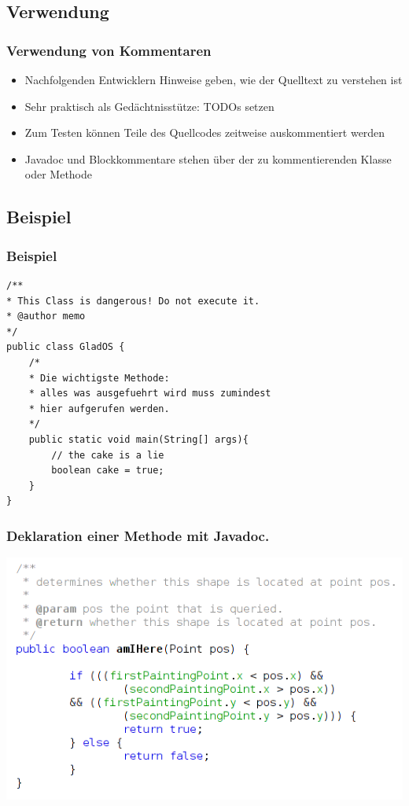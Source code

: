 \documentclass[final]{beamer}
\begin{document}
\subsection{Verwendung}
\begin{frame}
	\frametitle{Verwendung von Kommentaren}
	\begin{itemize}
		\item{Nachfolgenden Entwicklern Hinweise geben, wie der Quelltext zu verstehen ist}
		\item{Sehr praktisch als Gedächtnisstütze: TODOs setzen}
		\item{Zum Testen können Teile des Quellcodes zeitweise auskommentiert werden}
		\item{Javadoc und Blockkommentare stehen über der zu kommentierenden Klasse oder Methode}
	\end{itemize}
\end{frame}

\subsection{Beispiel}
\begin{frame}[containsverbatim]
\frametitle{Beispiel}
	\begin{lstlisting}
/**
* This Class is dangerous! Do not execute it.
* @author memo
*/
public class GladOS {
	/*
	* Die wichtigste Methode: 
	* alles was ausgefuehrt wird muss zumindest 
	* hier aufgerufen werden.
	*/
	public static void main(String[] args){
		// the cake is a lie
		boolean cake = true;
	}
}

	\end{lstlisting}
\end{frame}

\begin{frame}
	\frametitle{Deklaration einer Methode mit Javadoc.}
	\includegraphics[scale=0.5]{JavaDoc_example_1_1.png}
\end{frame}
\end{document}
